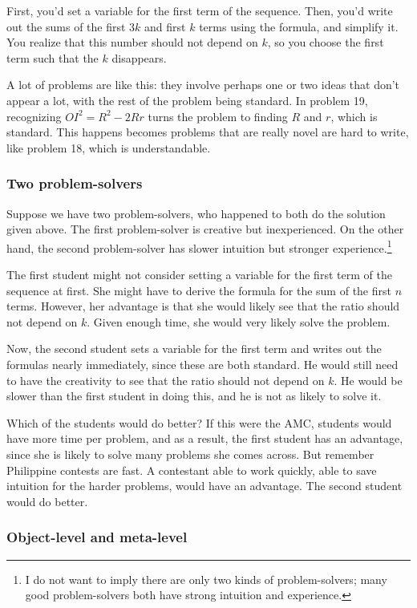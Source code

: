 \documentclass[11pt,paper=letter]{scrartcl}
\begin{document}
First, you'd set a variable for the first term of the sequence. Then, you'd write out the sums of the first $3k$ and first $k$ terms using the formula, and simplify it. You realize that this number should not depend on $k$, so you choose the first term such that the $k$ disappears.

A lot of problems are like this: they involve perhaps one or two ideas that don't appear a lot, with the rest of the problem being standard. In problem 19, recognizing $OI^2 = R^2 - 2Rr$ turns the problem to finding $R$ and $r$, which is standard. This happens becomes problems that are really novel are hard to write, like problem 18, which is understandable.

\subsubsection*{Two problem-solvers}

Suppose we have two problem-solvers, who happened to both do the solution given above. The first problem-solver is creative but inexperienced. On the other hand, the second problem-solver has slower intuition but stronger experience.\footnote{I do not want to imply there are only two kinds of problem-solvers; many good problem-solvers both have strong intuition and experience.}

The first student might not consider setting a variable for the first term of the sequence at first. She might have to derive the formula for the sum of the first $n$ terms. However, her advantage is that she would likely see that the ratio should not depend on $k$. Given enough time, she would very likely solve the problem.

Now, the second student sets a variable for the first term and writes out the formulas nearly immediately, since these are both standard. He would still need to have the creativity to see that the ratio should not depend on $k$. He would be slower than the first student in doing this, and he is not as likely to solve it. 

Which of the students would do better? If this were the AMC, students would have more time per problem, and as a result, the first student has an advantage, since she is likely to solve many problems she comes across. But remember Philippine contests are fast. A contestant able to work quickly, able to save intuition for the harder problems, would have an advantage. The second student would do better.

\subsubsection*{Object-level and meta-level}
\end{document}
